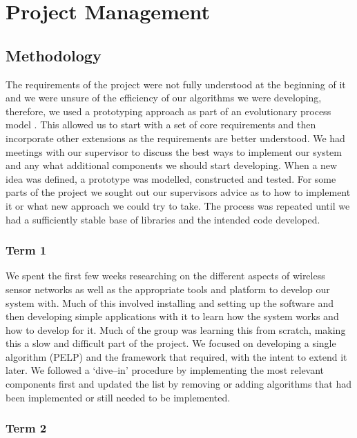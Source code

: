 \section{Project Management}

\subsection{Methodology}

The requirements of the project were not fully understood at the beginning of it and we were unsure of the efficiency of our algorithms we were developing, therefore, we used a prototyping approach as part of an evolutionary process model \cite{?}. This allowed us to start with a set of core requirements and then incorporate other extensions as the requirements are better understood. We had meetings with our supervisor to discuss the best ways to implement our system and any what additional components we should start developing. When a new idea was defined, a prototype was modelled, constructed and tested. For some parts of the project we sought out our supervisors advice as to how to implement it or what new approach we could try to take. The process was repeated until we had a sufficiently stable base of libraries and the intended code developed.

\subsubsection*{Term 1}

We spent the first few weeks researching on the different aspects of wireless sensor networks as well as the appropriate tools and platform to develop our system with. Much of this involved installing and setting up the software and then developing simple applications with it to learn how the system works and how to develop for it. Much of the group was learning this from scratch, making this a slow and difficult part of the project. We focused on developing a single algorithm (PELP) and the framework that required, with the intent to extend it later. We followed a `dive--in' procedure \cite{?} by implementing the most relevant components first and updated the list by removing or adding algorithms that had been implemented or still needed to be implemented.


\subsubsection*{Term 2}

